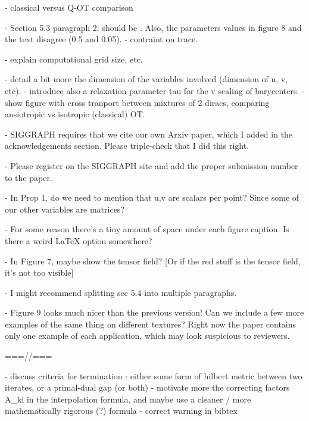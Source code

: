 - classical versus Q-OT comparison

- Section 5.3 paragraph 2: \tau should be \rho. Also, the parameters values in figure 8 and the text disagree (0.5 and 0.05).
- contraint on trace.

- explain computational grid size, etc.


- detail a bit more the dimension of the variables involved (dimension of u, v, etc).
- introduce also a relaxation parameter tau for the v scaling of barycenters.
- show figure with cross tranport between mixtures of 2 diracs, comparing ansiotropic vs isotropic (classical) OT. 


- SIGGRAPH requires that we cite our own Arxiv paper, which I added in the acknowledgements section.  Please triple-check that I did this right.

- Please register on the SIGGRAPH site and add the proper submission number to the paper.

- In Prop 1, do we need to mention that u,v are scalars per point?  Since some of our other variables are matrices?

- For some reason there's a tiny amount of space under each figure caption.  Is there a weird LaTeX option somewhere?

- In Figure 7, maybe show the tensor field?  [Or if the red stuff is the tensor field, it's not too visible]

- I might recommend splitting sec 5.4 into multiple paragraphs.

- Figure 9 looks much nicer than the previous version!  Can we include a few more examples of the same thing on different textures?  Right now the paper contains only one example of each application, which may look suspicious to reviewers.


===//===

- discuss criteria for termination : either some form of hilbert metric between two iterates, or a primal-dual gap (or both)
- motivate more the correcting factors A_ki in the interpolation formula, and maybe use a cleaner / more mathematically rigorous (?) formula 
- correct warning in bibtex